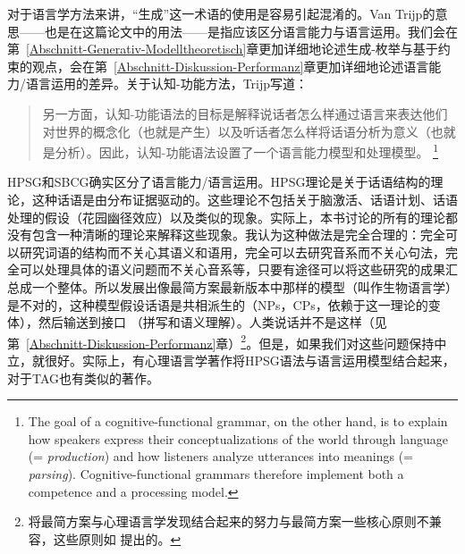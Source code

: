 对于语言学方法来讲，“生成”这一术语的使用是容易引起混淆的。Van Trijp的意思——也是在这篇论文中的用法——是指应该区分语言能力与语言运用。我们会在第~\ref{Abschnitt-Generativ-Modelltheoretisch}章更加详细地论述生成-枚举与基于约束的观点，会在第~\ref{Abschnitt-Diskussion-Performanz}章更加详细地论述语言能力/语言运用的差异。关于认知-功能方法，Trijp写道：
\begin{quotation}
另一方面，认知-功能语法的目标是解释说话者怎么样通过语言来表达他们对世界的概念化（也就是产生）以及听话者怎么样将话语分析为意义（也就是分析）。因此，认知-功能语法设置了一个语言能力模型和处理模型。 \citep[]{vanTrijp2013a}\footnote{%
The goal of a cognitive-functional grammar, on the other hand, is to explain
how speakers express their conceptualizations of the world through language
(= \emph{production}) and how listeners analyze utterances into meanings (= \emph{parsing}).
Cognitive-functional grammars therefore implement both a competence and a
processing model.}
\end{quotation}
HPSG和SBCG确实区分了语言能力/语言运用\citep{SW2011a}。HPSG理论是关于话语结构的理论，这种话语是由分布证据驱动的。这些理论不包括关于脑激活、话语计划、话语处理的假设（花园幽径效应）以及类似的现象。实际上，本书讨论的所有的理论都没有包含一种清晰的理论来解释这些现象。我认为这种做法是完全合理的：完全可以研究词语的结构而不关心其语义和语用，完全可以去研究音系而不关心句法，完全可以处理具体的语义问题而不关心音系等，只要有途径可以将这些研究的成果汇总成一个整体。所以发展出像最简方案\indexmpc 最新版本中那样的模型（叫作生物语言学）是不对的，这种模型假设话语是共相派生的（NPs，CPs，依赖于这一理论的变体），然后输送到接口 （拼写和语义理解）。人类说话并不是这样（见第~\ref{Abschnitt-Diskussion-Performanz}章）\footnote{%
将最简方案与心理语言学发现结合起来的努力与最简方案一些核心原则不兼容，这些原则如 \citet{Chomsky2008a}提出的。 
}。但是，如果我们对这些问题保持中立，就很好。实际上，有心理语言学著作将HPSG语法与语言运用模型结合起来\citep{Konieczny96a-u}，对于TAG也有类似的著作\citep{SJ93a,DK2008a-u}。
